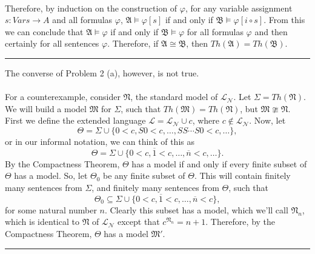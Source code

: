 \documentclass[11pt]{hmcpset}
\newenvironment{problem2}[1]{\noindent {\bf (#1}}
{\medskip}
\newenvironment{problem1}[1]{\noindent {\bf Problem #1}}
{\medskip}
\newenvironment{proof}{\noindent {\bf Proof:} \\}{\hfill
\rule{1mm}{3mm} \bigskip}
\begin{document}
\begin{problem1}{2. (a)}
\begin{proof}
Therefore, by induction on the construction of $\varphi$, for any variable assignment $s:Vars\to A$ and all formulas $\varphi$, $\mathfrak{A}\vDash\varphi [s]$ if and only if $\mathfrak{B}\vDash\varphi [i\circ s]$. From this we can conclude that $\mathfrak{A}\vDash\varphi$ if and only if $\mathfrak{B}\vDash\varphi$ for all formulas $\varphi$ and then certainly for all sentences $\varphi$. Therefore, if $\mathfrak{A}\cong\mathfrak{B}$, then $Th(\mathfrak{A})=Th(\mathfrak{B})$.
\end{proof}
\end{problem1}

\begin{problem2}{b)} The converse of Problem 2 (a), however, is not true.\\
\begin{proof}For a counterexample, consider $\mathfrak{N}$, the standard model of $\mathcal{L_N}$. Let $\Sigma = Th(\mathfrak{N})$. We will build a model $\mathfrak{M}$ for $\Sigma$, such that $Th(\mathfrak{M})=Th(\mathfrak{N})$, but $\mathfrak{M}\ncong\mathfrak{N}$. First we define the extended language $\mathcal{L} = \mathcal{L_N} \cup c$, where $c \notin \mathcal{L_N}$. Now, let $$\Theta =\Sigma \cup \{0<c, S0<c,\ldots ,SS\cdots S0<c,\ldots \},$$ or in our informal notation, we can think of this as $$\Theta =\Sigma \cup \{0<c, \overline{1}<c,\ldots ,\overline{n}<c,\ldots \}.$$  By the Compactness Theorem, $\Theta$ has a model if and only if every finite subset of $\Theta$ has a model. So, let $\Theta_0$ be any finite subset of $\Theta$. This will contain finitely many sentences from $\Sigma$, and finitely many sentences from $\Theta$, such that $$\Theta_0 \subseteq \Sigma \cup \{0<c, \overline{1}<c,\ldots ,\overline{n}<c\},$$
for some natural number $n$. Clearly this subset has a model, which we'll call $\mathfrak{N}_n$, which is identical to $\mathfrak{N}$ of $\mathcal{L_N}$ except that $c^{\mathfrak{N}_n}=n+1.$ Therefore, by the Compactness Theorem, $\Theta$ has a model $\mathfrak{M'}$.


\end{proof}
\end{problem2}
\end{document}
